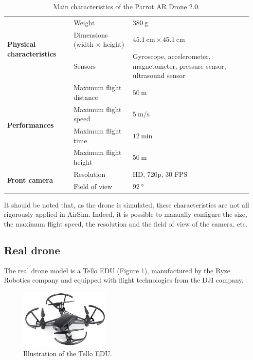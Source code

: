 \begin{table}[H]
    \centering
    \begin{tabular}{|l|l|p{4cm}|}
        \hline
        \multirow{3}{*}{\textbf{Physical characteristics}} & Weight & $\SI{380}{\gram}$ \\ \cline{2-3}
        & Dimensions (width $\times$ height) & $\SI{45.1}{\centi\meter} \times \SI{45.1}{\centi\meter}$ \\ \cline{2-3}
        & Sensors & Gyroscope, accelerometer, magnetometer, pressure sensor, ultrasound sensor \\ \hline
        \hline
        \multirow{4}{*}{\textbf{Performances}} & Maximum flight distance & $\SI{50}{\meter}$ \\ \cline{2-3}
        & Maximum flight speed & $\SI{5}{\meter\per\second}$ \\ \cline{2-3}
        & Maximum flight time & $\SI{12}{\minute}$ \\ \cline{2-3}
        & Maximum flight height & $\SI{50}{\meter}$ \\ \hline
        \hline
        \multirow{2}{*}{\textbf{Front camera}} & Resolution & HD, 720p, 30 FPS \\ \cline{2-3}
        & Field of view & $\SI{92}{\degree}$ \\ \hline
    \end{tabular}
    \caption{Main characteristics of the Parrot AR Drone 2.0. \cite{wikipedia2021parrotardrone, grosbill2021parrotardrone}}
    \label{tab:04.parrot.ar.drone.2.0.characteristics}
\end{table}

It should be noted that, as the drone is simulated, these characteristics are not all rigorously applied in AirSim. Indeed, it is possible to manually configure the size, the maximum flight speed, the resolution and the field of view of the camera, etc.

\subsection{Real drone}

The real drone model is a Tello EDU \cite{ryzerobotics2021telloedu} (Figure \ref{fig:04.tello.edu.illustration}), manufactured by the Ryze Robotics company and equipped with flight technologies from the DJI company.

\begin{figure}[H]
    \centering
    \includegraphics[width=0.4\textwidth]{resources/png/04/tello-edu.png}
    \caption{Illustration of the Tello EDU. \cite{robotadvance2021telloedu}}
    \label{fig:04.tello.edu.illustration}
\end{figure}

